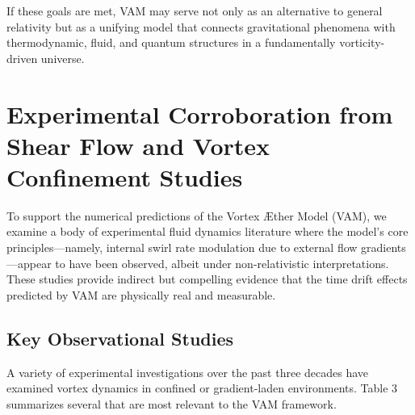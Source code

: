 \documentclass[a4paper, aps,preprint,superscriptaddress, 12pt]{revtex4}
\begin{document}
If these goals are met, VAM may serve not only as an alternative to general relativity but as a unifying model that connects gravitational phenomena with thermodynamic, fluid, and quantum structures in a fundamentally vorticity-driven universe.



\section{Experimental Corroboration from Shear Flow and Vortex Confinement Studies}

To support the numerical predictions of the Vortex Æther Model (VAM), we examine a body of experimental fluid dynamics literature where the model's core principles---namely, internal swirl rate modulation due to external flow gradients---appear to have been observed, albeit under non-relativistic interpretations. These studies provide indirect but compelling evidence that the time drift effects predicted by VAM are physically real and measurable.


\subsection{Key Observational Studies}

A variety of experimental investigations over the past three decades have examined vortex dynamics in confined or gradient-laden environments. Table 3 summarizes several that are most relevant to the VAM framework.
\end{document}
